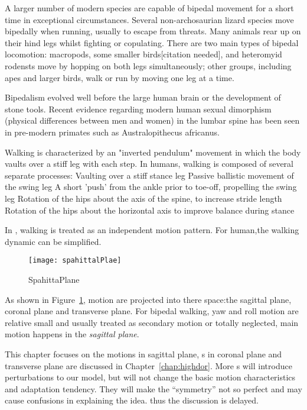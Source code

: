 A larger number of modern species are capable of bipedal movement for a short time in exceptional circumstances.
Several non-archosaurian lizard species move bipedally when running, usually to escape from threats. 
Many animals rear up on their hind legs whilst fighting or copulating. 
There are two main types of bipedal locomotion: macropods, some smaller birds[citation needed], and heteromyid rodensts move by hopping on both legs simultaneously; other groups, including apes and larger birds, walk or run by moving one leg at a time.

Bipedalism evolved well before the large human brain or the development of stone tools.
Recent evidence regarding modern human sexual dimorphism (physical differences between men and women) in the lumbar spine has been seen in pre-modern primates such as Australopithecus africanus. 





Walking is characterized by an "inverted pendulum" movement in which the body vaults over a stiff leg with each step.
In humans, walking is composed of several separate processes:
Vaulting over a stiff stance leg
Passive ballistic movement of the swing leg
A short 'push' from the ankle prior to toe-off, propelling the swing leg
Rotation of the hips about the axis of the spine, to increase stride length
Rotation of the hips about the horizontal axis to improve balance during stance

In \moit, walking is treated as an independent motion pattern.
For human,the walking dynamic can be simplified.


\begin{figure}[!htbp]
  \begin{center}
    \texttt{[image: spahittalPlae]}
    \caption{SpahittaPlane}
    \label{fig:passivekneewalker}
\end{center}
\end{figure}

As shown in Figure~\ref{fig:passivekneewalker}, motion are projected into there space:the sagittal plane, coronal plane and transverse plane.
For bipedal walking,
 yaw and roll motion are relative small and usually treated as secondary motion or totally neglected,  main motion happens in the \emph{sagittal plane}.




This chapter focuses on the motions in sagittal plane,  \dof s in coronal plane and transverse plane are discussed in Chapter~\ref{chap:highdor}.
More \dof s will introduce perturbations to our model, but will not change the basic motion characteristics and adaptation tendency.
They will make the ``symmetry'' not so perfect and may cause confusions in explaining the idea. thus the discussion is delayed.




